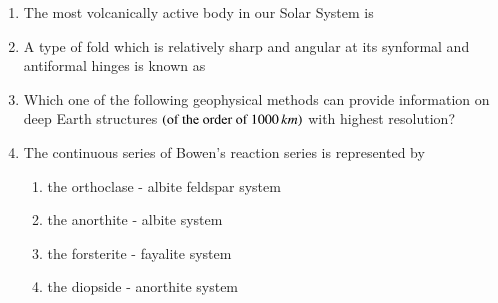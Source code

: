 \documentclass[journal,12pt,onecolumn]{IEEEtran}
\theoremstyle{remark}
\begin{document}
\begin{enumerate}
\item The most volcanically active body in our Solar System is  \hfill{}
\begin{enumerate}
\end{enumerate}

\item A type of fold which is relatively sharp and angular at its synformal and antiformal hinges is known as  \hfill{}
\begin{enumerate}
\end{enumerate}

\item Which one of the following geophysical methods can provide information on deep Earth structures $\left(\text{of the order of }1000\,km\right)$ with highest resolution? \hfill{}
\begin{enumerate}
\end{enumerate}

\item The continuous series of Bowen's reaction series is represented by  \hfill{}
\begin{enumerate}
    \item the orthoclase - albite feldspar system
    \item the anorthite - albite system
    \item the forsterite - fayalite system
    \item the diopside - anorthite system
\end{enumerate}


\end{enumerate}
\end{document}
